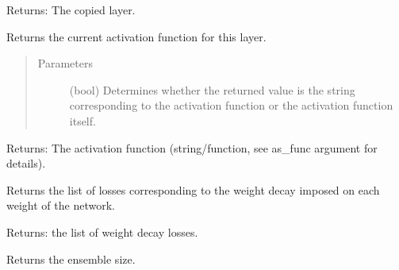 \documentclass[letterpaper,10pt,english,openany,oneside]{sphinxmanual}
\begin{document}
\begin{fulllineitems}
\begin{fulllineitems}
\begin{quote}
\begin{description}
\begin{itemize}
\end{itemize}

\end{description}\end{quote}

Returns: The copied layer.

\end{fulllineitems}


\begin{fulllineitems}
\label{\detokenize{_modules/layers:layers.FC.FC.get_activation}}
Returns the current activation function for this layer.
\begin{quote}\begin{description}
\item[{Parameters}] \leavevmode
{} \textendash{} (bool) Determines whether the returned value is the string corresponding to the activation function or the activation function itself.

\end{description}\end{quote}

Returns: The activation function (string/function, see as\_func argument for details).

\end{fulllineitems}


\begin{fulllineitems}
\label{\detokenize{_modules/layers:layers.FC.FC.get_decays}}
Returns the list of losses corresponding to the weight decay imposed on each weight of the
network.

Returns: the list of weight decay losses.

\end{fulllineitems}


\begin{fulllineitems}
\label{\detokenize{_modules/layers:layers.FC.FC.get_ensemble_size}}
Returns the ensemble size.


\end{fulllineitems}
\end{fulllineitems}
\end{document}
